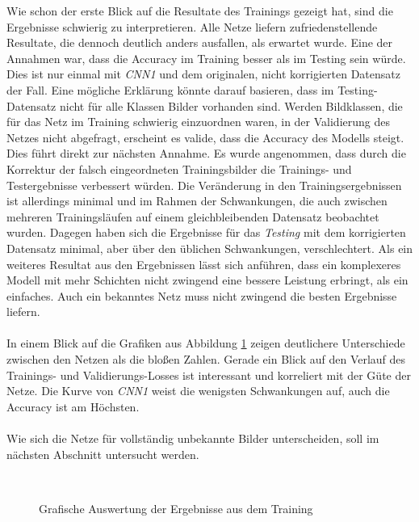Wie schon der erste Blick auf die Resultate des Trainings gezeigt hat, sind die Ergebnisse schwierig zu interpretieren. Alle Netze liefern zufriedenstellende Resultate, die dennoch deutlich anders ausfallen, als erwartet wurde. Eine der Annahmen war, dass die Accuracy im Training besser als im Testing sein würde. Dies ist nur einmal mit \textit{CNN1} und dem originalen, nicht korrigierten Datensatz der Fall. Eine mögliche Erklärung könnte darauf basieren, dass im Testing-Datensatz nicht für alle Klassen Bilder vorhanden sind. Werden Bildklassen, die für das Netz im Training schwierig einzuordnen waren, in der Validierung des Netzes nicht abgefragt, erscheint es valide, dass die Accuracy des Modells steigt.
Dies führt direkt zur nächsten Annahme. Es wurde angenommen, dass durch die Korrektur der falsch eingeordneten Trainingsbilder die Trainings- und Testergebnisse verbessert würden. Die Veränderung in den Trainingsergebnissen ist allerdings minimal und im Rahmen der Schwankungen, die auch zwischen mehreren Trainingsläufen auf einem gleichbleibenden Datensatz beobachtet wurden. Dagegen haben sich die Ergebnisse für das \textit{Testing} mit dem korrigierten Datensatz minimal, aber über den üblichen Schwankungen, verschlechtert. 
Als ein weiteres Resultat aus den Ergebnissen lässt sich anführen, dass ein komplexeres Modell mit mehr Schichten nicht zwingend eine bessere Leistung erbringt, als ein einfaches. Auch ein bekanntes Netz muss nicht zwingend die besten Ergebnisse liefern.\\
\\
In einem Blick auf die Grafiken aus Abbildung \ref{pic:figs} zeigen deutlichere Unterschiede zwischen den Netzen als die bloßen Zahlen. Gerade ein Blick auf den Verlauf des Trainings- und Validierungs-Losses ist interessant und korreliert mit der Güte der Netze. Die Kurve von \textit{CNN1} weist die wenigsten Schwankungen auf, auch die Accuracy ist am Höchsten. \\
\\
Wie sich die Netze für vollständig unbekannte Bilder unterscheiden, soll im nächsten Abschnitt untersucht werden.

\begin{figure} [!ht]
	\centering
	\\
	\caption{Grafische Auswertung der Ergebnisse aus dem Training} \label{pic:figs}
\end{figure}
\newpage

